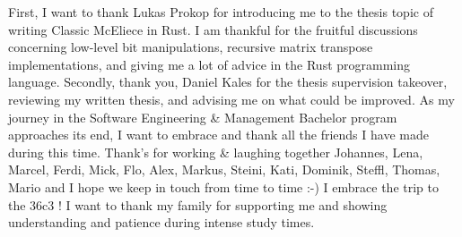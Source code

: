 \documentclass[11pt,
  oneside,openany,    %
]{scrreprt}
\begin{document}
First, I want to thank Lukas Prokop for introducing me to the thesis topic of writing Classic McEliece in Rust. I am thankful for the fruitful discussions concerning low-level bit manipulations, recursive matrix transpose implementations, and giving me a lot of advice in the Rust programming language.
Secondly, thank you, Daniel Kales for the thesis supervision takeover, reviewing my written thesis, and advising me on what could be improved. As my journey in the Software Engineering \& Management Bachelor program approaches its end, I want to embrace and thank all the friends I have made during this time. Thank's for working \& laughing together Johannes, Lena, Marcel, Ferdi, Mick, Flo, Alex, Markus, Steini, Kati, Dominik, Steffl, Thomas, Mario and I hope we keep in touch from time to time :-) I embrace the trip to the 36c3 ! I want to thank my family for supporting me and showing understanding and patience during intense study times.



\printbibliography[heading=bibintoc]
\end{document}
